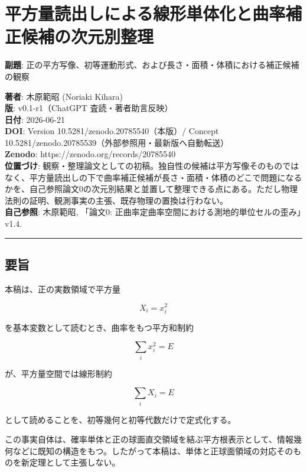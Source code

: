 \documentclass[
]{ltjsarticle}
\author{}
\date{}
\begin{document}
\section{平方量読出しによる線形単体化と曲率補正候補の次元別整理}\label{ux5e73ux65b9ux91cfux8aadux51faux3057ux306bux3088ux308bux7ddaux5f62ux5358ux4f53ux5316ux3068ux66f2ux7387ux88dcux6b63ux5019ux88dcux306eux6b21ux5143ux5225ux6574ux7406}

\textbf{副題}:
正の平方写像、初等運動形式、および長さ・面積・体積における補正候補の観察

\textbf{著者}: 木原範昭 (Noriaki Kihara)\\
\textbf{版}: v0.1-r1（ChatGPT 査読・著者助言反映）\\
\textbf{日付}: 2026-06-21\\
\textbf{DOI}: Version 10.5281/zenodo.20785540（本版）/ Concept
10.5281/zenodo.20785539（外部参照用・最新版へ自動転送）\\
\textbf{Zenodo}: https://zenodo.org/records/20785540\\
\textbf{位置づけ}:
観察・整理論文としての初稿。独自性の候補は平方写像そのものではなく、平方量読出しの下で曲率補正候補が長さ・面積・体積のどこで問題になるかを、自己参照論文0の次元別結果と並置して整理できる点にある。ただし物理法則の証明、観測事実の主張、既存物理の置換は行わない。\\
\textbf{自己参照}: 木原範昭, 「論文0:
正曲率定曲率空間における測地的単位セルの歪み」v1.4.

\begin{center}\rule{0.5\linewidth}{0.5pt}\end{center}

\subsection{要旨}\label{ux8981ux65e8}

本稿は、正の実数領域で平方量

\[
X_i=x_i^2
\]

を基本変数として読むとき、曲率をもつ平方和制約

\[
\sum_i x_i^2=E
\]

が、平方量空間では線形制約

\[
\sum_i X_i=E
\]

として読めることを、初等幾何と初等代数だけで定式化する。

この事実自体は、確率単体と正の球面直交領域を結ぶ平方根表示として、情報幾何などに既知の構造をもつ。したがって本稿は、単体と正球面領域の対応そのものを新定理として主張しない。
\end{document}

